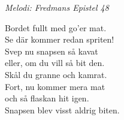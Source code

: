 {\footnotesize\textit{Melodi: Fredmans Epistel 48}}\par
\vspace{10pt}
Bordet fullt med go'er mat.\\
Se där kommer redan spriten!\\
Svep nu snapsen så kavat\\
eller, om du vill så bit den.\\
Skål du granne och kamrat.\\
Fort, nu kommer mera mat\\
och så flaskan hit igen.\\
Snapsen blev visst aldrig biten.

